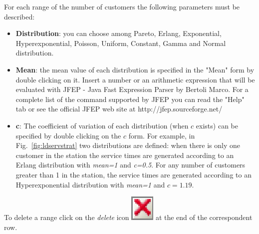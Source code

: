 \begin{itemize}
For each range of the number of customers the following parameters
must be described: \begin{itemize} \item \textbf{Distribution}:
you can choose among Pareto, Erlang, Exponential,
Hyperexponential, Poisson, Uniform, Constant, Gamma and Normal
distribution. \item \textbf{Mean}: the mean value of each
distribution is specified in the "Mean" form by double clicking on
it. Insert a number or an arithmetic expression that will be
evaluated with JFEP - Java Fast Expression Parser by Bertoli
Marco. For a complete list of the command supported by JFEP you
can read the "Help" tab or see the official JFEP web site at
http://jfep.sourceforge.net/ \item \textbf{c}: The coefficient of
variation of each distribution (when $c$ exists) can be specified
by double clicking on the $c$ form. For example, in
Fig.~\ref{fig:ldservstrat} two distributions are defined: when there is
only one customer in the station the service times are generated
according to an Erlang distribution with \emph{mean=1} and
\emph{c=0.5}. For any number of customers greater than 1 in the
station, the service times are generated according to an
Hyperexponential distribution with \emph{mean=1} and $c=1.19$.
\end{itemize}
\noindent To delete a range click on the \emph{delete} icon
\includegraphics[scale=.5]{img/jsim/delete.eps}
at the end of the correspondent row.

\end{itemize}


